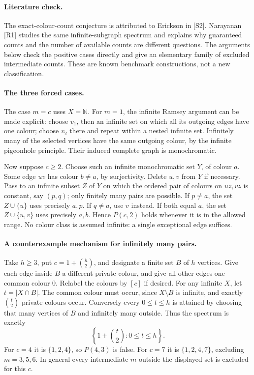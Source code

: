 \documentclass[11pt,a4paper]{article}
\begin{document}
\paragraph{Literature check.}
The exact-colour-count conjecture is attributed to Erickson in [S2].
Narayanan [R1] studies the same infinite-subgraph spectrum and explains
why guaranteed counts and the number of available counts are different
questions. The arguments below check the positive cases directly and
give an elementary family of excluded intermediate counts. These are
known benchmark constructions, not a new classification.

\paragraph{The three forced cases.}
The case $m=c$ uses $X=\mathbb N$. For $m=1$, the infinite Ramsey
argument can be made explicit: choose $v_1$, then an infinite set on
which all its outgoing edges have one colour; choose $v_2$ there and
repeat within a nested infinite set. Infinitely many of the selected
vertices have the same outgoing colour, by the infinite pigeonhole
principle. Their induced complete graph is monochromatic.

Now suppose $c\ge2$. Choose such an infinite monochromatic set $Y$,
of colour $a$. Some edge $uv$ has colour $b\ne a$, by surjectivity.
Delete $u,v$ from $Y$ if necessary. Pass to an infinite subset $Z$ of
$Y$ on which the ordered pair of colours on $uz,vz$ is constant,
say $(p,q)$; only finitely many pairs are possible. If $p\ne a$, the
set $Z\cup\{u\}$ uses precisely $a,p$. If $q\ne a$, use $v$
instead. If both equal $a$, the set $Z\cup\{u,v\}$ uses precisely
$a,b$. Hence $P(c,2)$ holds whenever it is in the allowed range.
No colour class is assumed infinite: a single exceptional edge suffices.

\paragraph{A counterexample mechanism for infinitely many pairs.}
Take $h\ge3$, put $c=1+\binom h2$, and designate a finite set $B$
of $h$ vertices. Give each edge inside $B$ a different private colour,
and give all other edges one common colour $0$. Relabel the colours
by $[c]$ if desired. For any infinite $X$, let $t=|X\cap B|$.
The common colour must occur, since $X\setminus B$ is infinite,
and exactly $\binom t2$ private colours occur. Conversely every
$0\le t\le h$ is attained by choosing that many vertices of $B$
and infinitely many outside. Thus the spectrum is exactly
\[
 \left\{1+\binom t2:0\le t\le h\right\}.
\]
For $c=4$ it is $\{1,2,4\}$, so $P(4,3)$ is false. For $c=7$
it is $\{1,2,4,7\}$, excluding $m=3,5,6$. In general every
intermediate $m$ outside the displayed set is excluded for this $c$.
\end{document}
